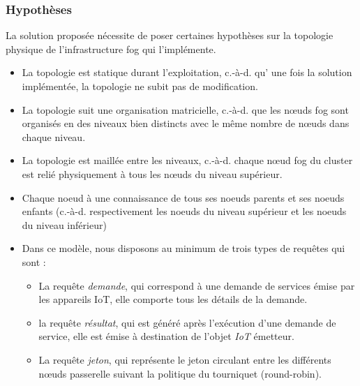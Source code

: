 \subsubsection{Hypothèses}
La solution proposée nécessite de poser certaines hypothèses sur la topologie physique de l'infrastructure fog qui l'implémente.\\
\begin{itemize}
    \item La topologie est statique durant l'exploitation, c.-à-d. qu' une fois la solution implémentée, la topologie ne subit pas de modification.
    \item La topologie suit une organisation matricielle, c.-à-d. que les nœuds fog sont organisés en des niveaux bien distincts avec le même nombre de nœuds dans chaque niveau.
    \item La topologie est maillée entre les niveaux, c.-à-d. chaque nœud fog du cluster est relié physiquement à tous les nœuds du niveau supérieur.
    \item Chaque noeud à une connaissance de tous ses noeuds parents et ses noeuds enfants (c.-à-d. respectivement les noeuds du niveau supérieur et les noeuds du niveau inférieur)
    \item Dans ce modèle, nous disposons au minimum de trois types de requêtes qui sont : \\
          \begin{itemize}
             \item La requête \emph{demande}, qui correspond à une demande de services émise par les appareils IoT, elle comporte tous les détails de la demande.
             \item la requête \emph{résultat}, qui est généré après l'exécution d'une demande de service, elle est émise à destination de l'objet \emph{IoT} émetteur.
             \item La requête \emph{jeton}, qui représente le jeton circulant entre les différents nœuds passerelle suivant la politique du tourniquet (round-robin).
          \end{itemize}
\end{itemize}

